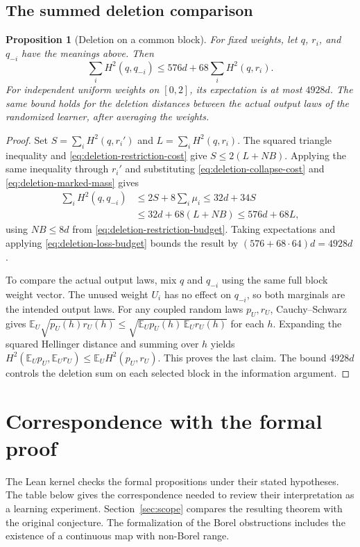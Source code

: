 \documentclass[11pt]{article}
\newtheorem{proposition}[theorem]{Proposition}
\theoremstyle{definition}\newtheorem{definition}[theorem]{Definition}
\begin{document}
\subsection{The summed deletion comparison}

\begin{proposition}[Deletion on a common block]
\label{prop:deletion-summed}
For fixed weights, let $q$, $r_i$, and $q_{-i}$ have the meanings above. Then
\begin{equation}
  \sum_i H^2(q,q_{-i})\le576d+68\sum_i H^2(q,r_i).
  \label{eq:deletion-pointwise-budget}
\end{equation}
For independent uniform weights on $[0,2]$, its expectation is at most
$4928d$. The same bound holds for the deletion distances between the actual
output laws of the randomized learner, after averaging the weights.
\end{proposition}

\begin{proof}
Set $S=\sum_i H^2(q,r_i')$ and $L=\sum_i H^2(q,r_i)$. The squared triangle
inequality and \eqref{eq:deletion-restriction-cost} give $S\le2(L+NB)$.
Applying the same inequality through $r_i'$ and substituting
\eqref{eq:deletion-collapse-cost} and \eqref{eq:deletion-marked-mass} gives
\begin{align*}
  \sum_i H^2(q,q_{-i})
     &\le 2S+8\sum_i\mu_i\le32d+34S \\
     &\le32d+68(L+NB)\le576d+68L,
\end{align*}
using $NB\le8d$ from \eqref{eq:deletion-restriction-budget}. Taking
expectations and applying \eqref{eq:deletion-loss-budget} bounds the result
by $(576+68\cdot64)d=4928d$.

To compare the actual output laws, mix $q$ and $q_{-i}$ using the same full
block weight vector. The unused weight $U_i$ has no effect on $q_{-i}$, so
both marginals are the intended output laws. For any coupled random laws
$p_U,r_U$, Cauchy--Schwarz gives
$\mathbb E_U\sqrt{p_U(h)r_U(h)}\le\sqrt{\mathbb E_U p_U(h)\,\mathbb E_U r_U(h)}$
for each $h$. Expanding the squared Hellinger distance and summing over $h$
yields
$H^2(\mathbb E_U p_U,\mathbb E_U r_U)\le\mathbb E_U H^2(p_U,r_U)$.
This proves the last claim. The bound $4928d$ controls the deletion sum
on each selected block in the information argument.
\end{proof}


\section{Correspondence with the formal proof}\label{app:map}
The Lean kernel checks the formal propositions under their stated hypotheses. The table
below gives the correspondence needed to review their interpretation as a
learning experiment. Section~\ref{sec:scope} compares the resulting theorem
with the original conjecture. The formalization of the Borel obstructions
includes the existence of a continuous map with non-Borel range.
\end{document}
